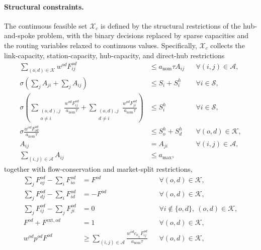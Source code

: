 \paragraph{Structural constraints.}
The continuous feasible set $\mathcal{X}_c$ is defined by the structural restrictions of the hub-and-spoke problem, with the binary decisions replaced by sparse capacities and the routing variables relaxed to continuous values. Specifically, $\mathcal{X}_c$ collects the link-capacity, station-capacity, hub-capacity, and direct-hub restrictions
\begin{align}
\sum_{(o,d)\in\mathcal{K}} w^{od}F_{ij}^{od}
&\le a_{\mathrm{nom}}\tau A_{ij}
&& \forall (i,j)\in\mathcal{A},
\label{eq:cont_link_cap}
\\
\sigma\left(\sum_j A_{ji}+\sum_j A_{ij}\right)
&\le S_i+S_i^h
&& \forall i\in\mathcal{S},
\label{eq:cont_station_cap}
\\
\sigma\left(
\sum_{\substack{(o,d),j\\ o\neq i}}\frac{w^{od}F_{ij}^{od}}{a_{\mathrm{nom}}\tau}
+
\sum_{\substack{(o,d),j\\ d\neq i}}\frac{w^{od}F_{ji}^{od}}{a_{\mathrm{nom}}\tau}
\right)
&\le S_i^h
&& \forall i\in\mathcal{S},
\label{eq:cont_hub_cap}
\\
\sigma\frac{w^{od}F_{od}^{od}}{a_{\mathrm{nom}}\tau}
&\le S_o^h+S_d^h
&& \forall (o,d)\in\mathcal{K},
\label{eq:cont_direct_hub}
\\
A_{ij}&=A_{ji}
&& \forall (i,j)\in\mathcal{A},
\label{eq:cont_symmetry}
\\
\sum_{(i,j)\in\mathcal{A}} A_{ij}
&\le a_{\max},
\label{eq:cont_fleet}
\end{align}
together with flow-conservation and market-split restrictions,
\begin{align}
\sum_j F_{oj}^{od}-\sum_i F_{io}^{od}
&=F^{od}
&& \forall (o,d)\in\mathcal{K},
\label{eq:cont_flow_start}
\\
\sum_j F_{dj}^{od}-\sum_i F_{id}^{od}
&=-F^{od}
&& \forall (o,d)\in\mathcal{K},
\label{eq:cont_flow_end}
\\
\sum_j F_{ij}^{od}-\sum_j F_{ji}^{od}
&=0
&& \forall i\notin\{o,d\},\ (o,d)\in\mathcal{K},
\label{eq:cont_flow_mid}
\\
F^{od}+F^{\mathrm{ext},od}
&=1
&& \forall (o,d)\in\mathcal{K},
\label{eq:cont_split}
\\
w^{od}p^{od}F^{od}
&\ge \sum_{(i,j)\in\mathcal{A}}
\frac{w^{od}c_{o_{ij}}F_{ij}^{od}}{a_{\mathrm{nom}}\tau}
&& \forall (o,d)\in\mathcal{K},
\label{eq:cont_profitability}
\end{align}
